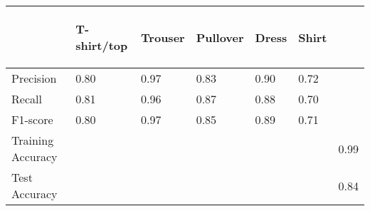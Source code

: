 \vspace{2em}
\begin{tabular}{lllllll}
&  \hspace{0.2em}\begin{rotate}{45} T-shirt/top \end{rotate}  &  \hspace{0.2em}\begin{rotate}{45} Trouser \end{rotate}  &  \hspace{0.2em}\begin{rotate}{45} Pullover \end{rotate}  &  \hspace{0.2em}\begin{rotate}{45} Dress \end{rotate}  &  \hspace{0.2em}\begin{rotate}{45} Shirt \end{rotate} \\
 \toprule
 Precision                       &                  0.80                  &                   0.97                    &                   0.83                   &                   0.90                   &                   0.72\\
 Recall                          &                  0.81                  &                   0.96                    &                   0.87                   &                   0.88                   &                   0.70\\
F1-score &                  0.80                  &                   0.97                    &                   0.85                   &                   0.89                   &                   0.71\\
 \midrule
Training Accuracy & & & & & & 0.99\\
Test Accuracy & & & & & & 0.84\\

 \bottomrule
\end{tabular}
